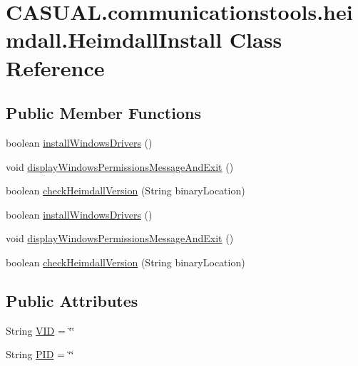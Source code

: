 \hypertarget{class_c_a_s_u_a_l_1_1communicationstools_1_1heimdall_1_1_heimdall_install}{\section{C\-A\-S\-U\-A\-L.\-communicationstools.\-heimdall.\-Heimdall\-Install Class Reference}
\label{class_c_a_s_u_a_l_1_1communicationstools_1_1heimdall_1_1_heimdall_install}
}
\subsection*{Public Member Functions}
\begin{DoxyCompactItemize}
\item 
boolean \hyperlink{class_c_a_s_u_a_l_1_1communicationstools_1_1heimdall_1_1_heimdall_install_aac1c0b7273f9a3578b6628f4ff6ec0e3}{install\-Windows\-Drivers} ()
\item 
void \hyperlink{class_c_a_s_u_a_l_1_1communicationstools_1_1heimdall_1_1_heimdall_install_ac074432d726842b14ed85159f814df9d}{display\-Windows\-Permissions\-Message\-And\-Exit} ()
\item 
boolean \hyperlink{class_c_a_s_u_a_l_1_1communicationstools_1_1heimdall_1_1_heimdall_install_a6408306d8b26b1d74b2a666377a133ad}{check\-Heimdall\-Version} (String binary\-Location)
\item 
boolean \hyperlink{class_c_a_s_u_a_l_1_1communicationstools_1_1heimdall_1_1_heimdall_install_aac1c0b7273f9a3578b6628f4ff6ec0e3}{install\-Windows\-Drivers} ()
\item 
void \hyperlink{class_c_a_s_u_a_l_1_1communicationstools_1_1heimdall_1_1_heimdall_install_ac074432d726842b14ed85159f814df9d}{display\-Windows\-Permissions\-Message\-And\-Exit} ()
\item 
boolean \hyperlink{class_c_a_s_u_a_l_1_1communicationstools_1_1heimdall_1_1_heimdall_install_a6408306d8b26b1d74b2a666377a133ad}{check\-Heimdall\-Version} (String binary\-Location)
\end{DoxyCompactItemize}
\subsection*{Public Attributes}
\begin{DoxyCompactItemize}
\item 
String \hyperlink{class_c_a_s_u_a_l_1_1communicationstools_1_1heimdall_1_1_heimdall_install_a2d2c4a0b189fafa46bc517a22ba55532}{V\-I\-D} = \char`\"{}\char`\"{}
\item 
String \hyperlink{class_c_a_s_u_a_l_1_1communicationstools_1_1heimdall_1_1_heimdall_install_a0ff9e2aa41e578e740f80f91679a5e39}{P\-I\-D} = \char`\"{}\char`\"{}
\end{DoxyCompactItemize}
